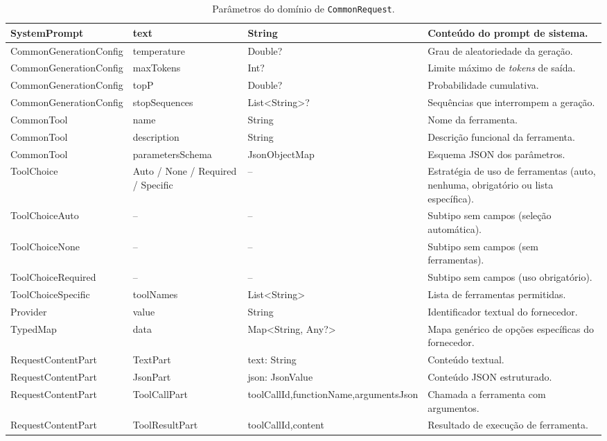 \begin{table}[H]
\begin{tabularx}{\textwidth}{|>{\raggedright\arraybackslash}p{2.9cm}|>{\raggedright\arraybackslash}p{2.6cm}|>{\raggedright\arraybackslash}p{2.6cm}|>{\raggedright\arraybackslash}X|}
    SystemPrompt & text & String & Conteúdo do prompt de sistema. \\ \hline

    Common\-GenerationConfig & temperature & Double? & Grau de aleatoriedade da geração. \\ \hline
    Common\-GenerationConfig & maxTokens & Int? & Limite máximo de \textit{tokens} de saída. \\ \hline
    Common\-GenerationConfig & topP & Double? & Probabilidade cumulativa. \\ \hline
    Common\-GenerationConfig & stopSequences & List<String>? & Sequências que interrompem a geração. \\ \hline

    CommonTool & name & String & Nome da ferramenta. \\ \hline
    CommonTool & description & String & Descrição funcional da ferramenta. \\ \hline
    CommonTool & parametersSchema & JsonObjectMap & Esquema JSON dos parâmetros. \\ \hline

    ToolChoice & Auto / None / Required / Specific & -- & Estratégia de uso de ferramentas (auto, nenhuma, obrigatório ou lista específica). \\ \hline
    ToolChoiceAuto & -- & -- & Subtipo sem campos (seleção automática). \\ \hline
    ToolChoiceNone & -- & -- & Subtipo sem campos (sem ferramentas). \\ \hline
    ToolChoiceRequired & -- & -- & Subtipo sem campos (uso obrigatório). \\ \hline
    ToolChoiceSpecific & toolNames & List<String> & Lista de ferramentas permitidas. \\ \hline

    Provider & value & String & Identificador textual do fornecedor. \\ \hline
    TypedMap & data & Map<String, Any?> & Mapa genérico de opções específicas do fornecedor. \\ \hline

    RequestContentPart & TextPart & text: String & Conteúdo textual. \\ \hline
    RequestContentPart & JsonPart & json: JsonValue & Conteúdo JSON estruturado. \\ \hline
    RequestContentPart & ToolCallPart & toolCallId,\newline functionName,\newline argumentsJson & Chamada a ferramenta com argumentos. \\ \hline
    RequestContentPart & ToolResultPart & toolCallId,\newline content & Resultado de execução de ferramenta. \\ \hline

    \end{tabularx}
    \caption{Parâmetros do domínio de \texttt{CommonRequest}.}
    \label{tab:request-parametros}
\end{table}

